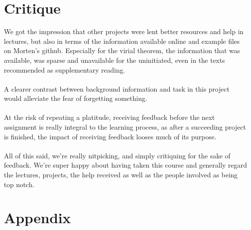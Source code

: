 \documentclass[10pt,a4paper]{article}
\begin{document}
\section{Critique}
We got the impression that other projects were lent better resources and help in lectures, but also in terms of the information available online and example files on Morten's github. Especially for the virial theorem, the information that was available, was sparse and unavailable for the uninitiated, even in the texts recommended as supplementary reading.\\\\
A clearer contrast between background information and task in this project would alleviate the fear of forgetting something.\\\\
At the risk of repeating a platitude, receiving  feedback before the next assignment is really integral to the learning process, as after a succeeding project is finished, the impact of receiving feedback looses much of its purpose.\\\\ All of this said, we're really nitpicking, and simply critiquing for the sake of feedback. We're super happy about having taken this course and generally regard the lectures, projects, the help received as well as the people involved as being top notch.
\section{Appendix}
\end{document}
